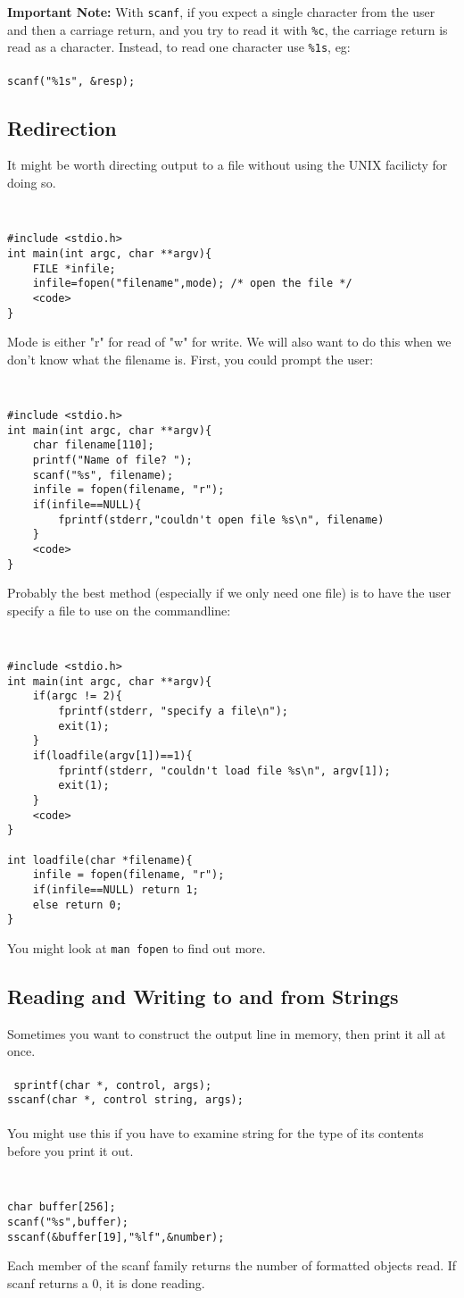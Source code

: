 \documentclass{article}
\begin{document}
{\bf Important Note:}  With {\tt scanf}, if you expect a single
character from the user and then a carriage return, and you try to read it with 
{\tt \%c}, the  carriage return is read as a character.  Instead, to
read one character use {\tt \%1s}, eg: \\\\
{\tt scanf("\%1s", \&resp);}

\subsection{Redirection}
It might be worth directing output to a file without using the UNIX
facilicty for doing so.
{\tt 
\begin{verbatim}
#include <stdio.h>
int main(int argc, char **argv){
    FILE *infile;
    infile=fopen("filename",mode); /* open the file */
    <code>
}
\end{verbatim}
}
Mode is either "r" for read of "w" for write.  We will also want
to do this when we don't know what the filename is.  First, you could
prompt the user:
{\tt 
\begin{verbatim}
#include <stdio.h>
int main(int argc, char **argv){
    char filename[110];
    printf("Name of file? ");
    scanf("%s", filename);
    infile = fopen(filename, "r");
    if(infile==NULL){
        fprintf(stderr,"couldn't open file %s\n", filename)
    }
    <code>
}
\end{verbatim}
}
Probably the best method (especially if we only need one file) is to
have the user specify a file to use on the commandline:
{\tt 
\begin{verbatim}
#include <stdio.h>
int main(int argc, char **argv){
    if(argc != 2){
        fprintf(stderr, "specify a file\n");
        exit(1);
    }
    if(loadfile(argv[1])==1){
        fprintf(stderr, "couldn't load file %s\n", argv[1]);
        exit(1);
    }
    <code>
}

int loadfile(char *filename){
    infile = fopen(filename, "r");
    if(infile==NULL) return 1;
    else return 0;
}
\end{verbatim}
}
You might look at {\tt man fopen} to find out more. 

\subsection{Reading and Writing to and from Strings}
Sometimes you want to construct the output line in memory,
then print it all at once.\\\\
{\tt
sprintf(char *, control, args);\\
sscanf(char *, control string, args);\\
}\\
You might use this if you have to examine string for the type of its 
contents before you print it out.
{\tt
\begin{verbatim}
char buffer[256];
scanf("%s",buffer);
sscanf(&buffer[19],"%lf",&number);
\end{verbatim}
}
Each member of the scanf family returns the number of formatted objects read.
If scanf returns a 0, it is done reading.
\end{document}

